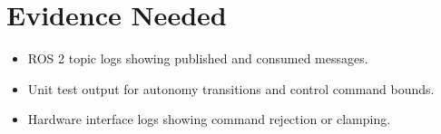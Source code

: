 \documentclass[12pt]{article}
\begin{document}
\section{Evidence Needed}
\begin{itemize}[leftmargin=*]
  \item ROS 2 topic logs showing published and consumed messages.
  \item Unit test output for autonomy transitions and control command bounds.
  \item Hardware interface logs showing command rejection or clamping.
\end{itemize}
\end{document}
